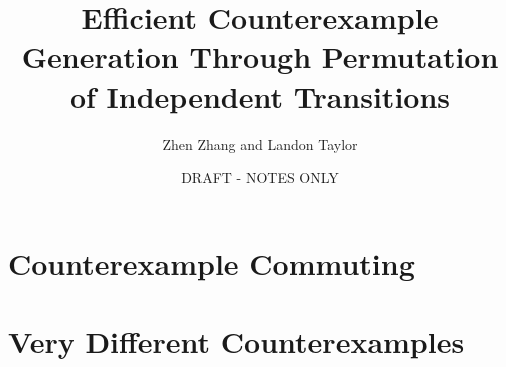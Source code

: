 \documentclass[11pt]{article}
\title{Efficient Counterexample Generation Through Permutation of Independent Transitions}
\author{Zhen Zhang and Landon Taylor}
\date{DRAFT - NOTES ONLY}
\begin{document}
\maketitle
\tableofcontents

\newpage
	
\section{Counterexample Commuting}



\newpage

\section{Very Different Counterexamples}



\newpage
\end{document}
